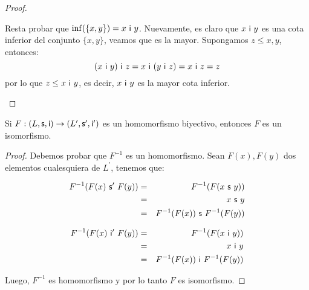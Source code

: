 \begin{proof}
\begin{itemize}
        \PN Resta probar que $\inf(\{x, y\}) = x \ \mathsf{i} \ y$. Nuevamente, es claro que $x \ \mathsf{i} \ y$ es una cota inferior
        del conjunto $\{x, y\}$, veamos que es la mayor. Supongamos $z \leq x, y$, entonces:
        \[
          (x \ \mathsf{i} \ y) \ \mathsf{i} \ z = x \ \mathsf{i} \ (y \ \mathsf{i} \ z) = x \ \mathsf{i} \ z = z
        \]
        \PN por lo que $z \leq x\ \mathsf{i} \ y$, es decir, $x\ \mathsf{i} \ y$ es la mayor cota inferior.
    \end{itemize}
  \end{proof}

  \begin{lemma} \label{lemma_5}
    \PN Si $F: (L, \mathsf{s}, \mathsf{i}) \rightarrow (L^{\prime}, \mathsf{s}^{\prime}, \mathsf{i}^{\prime})$ es un homomorfismo biyectivo, entonces $F$ es un isomorfismo.
  \end{lemma}
  \begin{proof}
    \PN Debemos probar que $F^{-1}$ es un homomorfismo. Sean $F(x), F(y)$ dos elementos cualesquiera de $L^{\prime}$,
    tenemos que:
    \begin{multicols}{2}
      \begin{eqnarray*}
        F^{-1}(F(x) \ \mathsf{s}^{\prime} \ F(y)) &=& F^{-1}(F(x \ \mathsf{s} \ y)) \\
        &=& x \ \mathsf{s} \ y \\
        &=& F^{-1}(F(x)) \ \mathsf{s} \ F^{-1}(F(y))
      \end{eqnarray*}

      \begin{eqnarray*}
        F^{-1}(F(x) \ \mathsf{i}^{\prime} \ F(y)) &=& F^{-1}(F(x \ \mathsf{i} \ y)) \\
        &=& x \ \mathsf{i} \ y \\
        &=& F^{-1}(F(x)) \ \mathsf{i} \ F^{-1}(F(y))
      \end{eqnarray*}
    \end{multicols}

    \PN Luego, $F^{-1}$ es homomorfismo y por lo tanto $F$ es isomorfismo.
  \end{proof}

